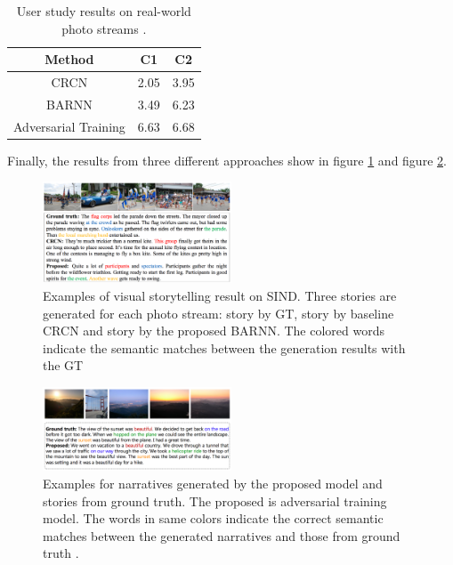 \documentclass[11pt]{article}
\begin{document}
\begin{table}[h]
\small
\centering
\begin{tabular}{c|c c}
\hline 
Method &C1 &C2 \\
\hline
CRCN &2.05 &3.95 \\
BARNN & 3.49 &6.23 \\
Adversarial Training &6.63 &6.68 \\
\hline
\end{tabular}
\caption{\label{tb:user} User study results on real-world photo streams \cite{show-reward-tell-automatic-generation-narrative-paragraph-photo-stream-adversarial-training}.}
\end{table}

Finally, the results from three different approaches show in figure \ref{fg:BARNN} and figure \ref{fg:Ad}.

\begin{figure}[h]
\includegraphics[width=0.5\textwidth]{BARNN}
\caption{Examples of visual storytelling result on SIND. Three stories are generated for each photo stream: story by GT, story by baseline CRCN and story by the proposed BARNN. The colored words indicate the semantic matches between the generation results with the GT \cite{liu2017let}}
\centering
\label{fg:BARNN}
\end{figure}

\begin{figure}[h]
\includegraphics[width=0.5\textwidth]{Adversarial}
\caption{ Examples for narratives generated by the proposed model and stories from ground truth. The proposed is adversarial training model. The words in same colors
indicate the correct semantic matches between the generated narratives and those from ground truth \cite{show-reward-tell-automatic-generation-narrative-paragraph-photo-stream-adversarial-training}.}
\centering
\label{fg:Ad}
\end{figure}
\end{document}
